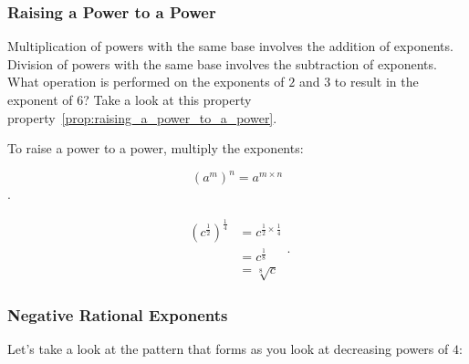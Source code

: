 
\subsubsection{Raising a Power to a Power}
\label{sub_sub_sec:raising_a_power_to_a_power}

Multiplication of powers with the same base involves the addition of exponents.
Division of powers with the same base involves the subtraction of exponents.
What operation is performed on the exponents of $2$ and $3$ to result in the
exponent of $6$? Take a look at this property
property~\ref{prop:raising_a_power_to_a_power}.

\begin{property}
  \label{prop:power_of_a_power_property}
  To raise a power to a power, multiply the exponents:

  \[ \left(a^{m}\right)^{n} = a^{m \times n} \].
\end{property}

\begin{example}
  \label{exm:power_of_a_power_property}

  \begin{equation}
    \label{eqt:raising_a_power_to_a_power}
    \begin{split}
      \left(c^{\frac{1}{2}}\right)^{\frac{1}{4}} &= c^{\frac{1}{2} \times \frac{1}{4}} \\
                  &= c^{\frac{1}{8}} \\
                  &= \sqrt[8]{c}
    \end{split}
  .\end{equation}
\end{example}


\subsubsection{Negative Rational Exponents}
\label{sub_sub_sec:negative_rational_exponents}

Let's take a look at the pattern that forms as you look at decreasing powers of
$4$:

